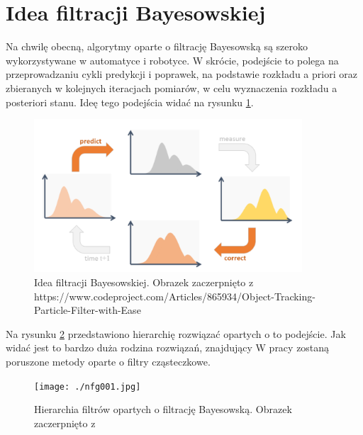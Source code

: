 \section{Idea filtracji Bayesowskiej}
Na chwilę obecną, algorytmy oparte o filtrację Bayesowską są szeroko wykorzystywane w automatyce i robotyce. W skrócie, podejście to polega na przeprowadzaniu cykli predykcji i poprawek, na podstawie rozkładu a priori oraz zbieranych w kolejnych iteracjach pomiarów, w celu wyznaczenia rozkładu a posteriori stanu. Ideę tego podejścia widać na rysunku \ref{bayes_fil_idea}. 
\begin{figure}
	\begin{center}
		\includegraphics[width=10cm]{./predict_update.png}
		\caption{Idea filtracji Bayesowskiej. Obrazek zaczerpnięto z https://www.codeproject.com/Articles/865934/Object-Tracking-Particle-Filter-with-Ease}
		\label{bayes_fil_idea}
	\end{center}
\end{figure}
Na rysunku \ref{filtr_hier} przedstawiono hierarchię rozwiązać opartych o to podejście. Jak widać jest to bardzo duża rodzina rozwiązań, znajdujący  W pracy zostaną poruszone metody oparte o filtry cząsteczkowe.
\begin{figure}
	\begin{center}
		\texttt{[image: ./nfg001.jpg]}
		\caption{Hierarchia filtrów opartych o filtrację Bayesowską. Obrazek zaczerpnięto z \cite{prac_gui}}
		\label{filtr_hier}
	\end{center}
\end{figure}

